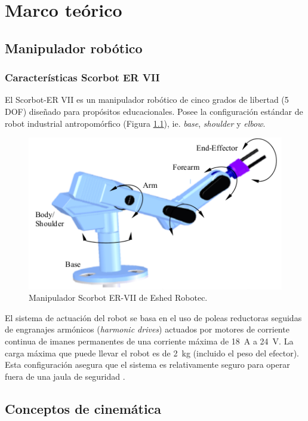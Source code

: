 \chapter{Marco teórico}

\section{Manipulador robótico}

\subsection{Características Scorbot ER VII}

El Scorbot-ER VII es un  manipulador robótico de cinco grados de libertad (5 DOF) diseñado para propósitos educacionales. Posee la configuración estándar de robot industrial antropomórfico (Figura \ref{cap2_scorbot}), ie. \textit{base}, \textit{shoulder} y \textit{elbow}.

\begin{figure}[ht]
  \centering
  \includegraphics[scale=0.5]{img/cap2/scorbot}
  \caption{Manipulador Scorbot ER-VII de Eshed Robotec.}
  \label{cap2_scorbot}
\end{figure}

El sistema de actuación del robot se basa en el uso de poleas reductoras seguidas de engranajes armónicos (\textit{harmonic drives}) actuados por motores de corriente continua de imanes permanentes de una corriente máxima de \SI{18}{\ampere} a \SI{24}{\volt}. La carga máxima que puede llevar el robot es de \SI{2}{\kilo\gram} (incluido el peso del efector). Esta configuración asegura que el sistema es relativamente seguro para operar fuera de una jaula de seguridad \cite{scorbot1998}.

\section{Conceptos de cinemática}

